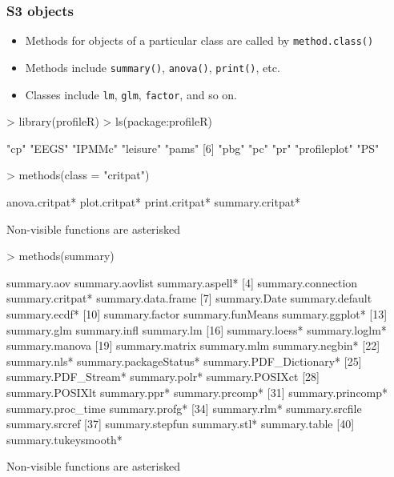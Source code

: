 \documentclass[xcolor=svgnames]{beamer}
\begin{document}
\begin{frame}[fragile]
  \frametitle{S3 objects}
  \scriptsize{
  \begin{itemize}
  \item Methods for objects of a particular class are called by \texttt{method.class()}
  \item Methods include \texttt{summary()}, \texttt{anova()}, \texttt{print()}, etc.
  \item Classes include \texttt{lm}, \texttt{glm}, \texttt{factor}, and so on.
  \end{itemize}
  }
\tiny{
\begin{Schunk}
\begin{Sinput}
> library(profileR)
> ls(package:profileR)
\end{Sinput}
\begin{Soutput}
 [1] "cp"          "EEGS"        "IPMMc"       "leisure"     "pams"       
 [6] "pbg"         "pc"          "pr"          "profileplot" "PS"         
\end{Soutput}
\begin{Sinput}
> methods(class = "critpat")
\end{Sinput}
\begin{Soutput}
[1] anova.critpat*   plot.critpat*    print.critpat*   summary.critpat*

   Non-visible functions are asterisked
\end{Soutput}
\begin{Sinput}
> methods(summary)
\end{Sinput}
\begin{Soutput}
 [1] summary.aov             summary.aovlist         summary.aspell*        
 [4] summary.connection      summary.critpat*        summary.data.frame     
 [7] summary.Date            summary.default         summary.ecdf*          
[10] summary.factor          summary.funMeans        summary.ggplot*        
[13] summary.glm             summary.infl            summary.lm             
[16] summary.loess*          summary.loglm*          summary.manova         
[19] summary.matrix          summary.mlm             summary.negbin*        
[22] summary.nls*            summary.packageStatus*  summary.PDF_Dictionary*
[25] summary.PDF_Stream*     summary.polr*           summary.POSIXct        
[28] summary.POSIXlt         summary.ppr*            summary.prcomp*        
[31] summary.princomp*       summary.proc_time       summary.profg*         
[34] summary.rlm*            summary.srcfile         summary.srcref         
[37] summary.stepfun         summary.stl*            summary.table          
[40] summary.tukeysmooth*   

   Non-visible functions are asterisked
\end{Soutput}
\end{Schunk}
}
\end{frame}
\end{document}
